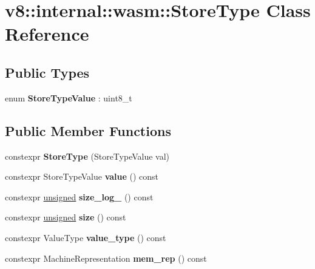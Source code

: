 \hypertarget{classv8_1_1internal_1_1wasm_1_1StoreType}{}\section{v8\+:\+:internal\+:\+:wasm\+:\+:Store\+Type Class Reference}
\label{classv8_1_1internal_1_1wasm_1_1StoreType}
\subsection*{Public Types}
\begin{DoxyCompactItemize}
\item 
\mbox{\label{classv8_1_1internal_1_1wasm_1_1StoreType_a4f52e210e62311741e5a0a542051e69f}} 
enum {\bfseries Store\+Type\+Value} \+: uint8\+\_\+t 
\end{DoxyCompactItemize}
\subsection*{Public Member Functions}
\begin{DoxyCompactItemize}
\item 
\mbox{\label{classv8_1_1internal_1_1wasm_1_1StoreType_aca436302a110e5f3c9c1051a26d92557}} 
constexpr {\bfseries Store\+Type} (Store\+Type\+Value val)
\item 
\mbox{\label{classv8_1_1internal_1_1wasm_1_1StoreType_a423fa5caf83c09380ed02818ca0a25c7}} 
constexpr Store\+Type\+Value {\bfseries value} () const
\item 
\mbox{\label{classv8_1_1internal_1_1wasm_1_1StoreType_aa3a63afeeef8856c0995421e74adc33b}} 
constexpr \mbox{\hyperlink{classunsigned}{unsigned}} {\bfseries size\+\_\+log\+\_} () const
\item 
\mbox{\label{classv8_1_1internal_1_1wasm_1_1StoreType_ae95a97bb020a8d25f95bd3b971d1334e}} 
constexpr \mbox{\hyperlink{classunsigned}{unsigned}} {\bfseries size} () const
\item 
\mbox{\label{classv8_1_1internal_1_1wasm_1_1StoreType_aa471e15b93a168c0346cc2743f55613c}} 
constexpr Value\+Type {\bfseries value\+\_\+type} () const
\item 
\mbox{\label{classv8_1_1internal_1_1wasm_1_1StoreType_a35c85576b69c581b912b2bfa6654e26a}} 
constexpr Machine\+Representation {\bfseries mem\+\_\+rep} () const
\end{DoxyCompactItemize}
